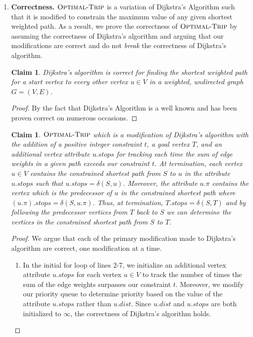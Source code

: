 \documentclass[11pt]{article}
\newtheorem{claim}[theorem]{Claim}
\theoremstyle{nonumberplain}
\newtheorem{proof}{Proof}
\begin{document}
\begin{enumerate}
\begin{codebox}
\end{codebox}
\item \textbf{Correctness.} %
$\textnormal{\scshape Optimal-Trip}$ is a variation of Dijkstra's Algorithm such that it is modified to constrain the maximum value of any given shortest weighted path. %
As a result, we prove the correctness of $\textnormal{\scshape Optimal-Trip}$ by assuming the correctness of Dijkstra's algorithm and arguing that our modifications are correct and do not \emph{break} the correctness of Dijkstra's algorithm.
\begin{claim}
Dijkstra's algorithm is correct for finding the shortest weighted path for a start vertex to every other vertex $u \in V$ in a weighted, undirected graph $G=(V,E)$.
\end{claim}
\begin{proof}
By the fact that Dijkstra's Algorithm is a well known and has been proven correct on numerous occasions.
\end{proof}
\begin{claim}
$\textnormal{\scshape Optimal-Trip}$ which is a modification of Dijkstra's algorithm with the addition of a positive integer constraint $t$, a goal vertex $T$, and an additional vertex attribute $u.stops$ for tracking each time the sum of edge weights in a given path exceeds our constraint $t$. At termination, each vertex $u \in V$ contains the constrained shortest path from $S$ to $u$ in the attribute $u.stops$ such that $u.stops=\delta(S,u)$. Moreover, the attribute $u.\pi$ contains the vertex which is the predecessor of $u$ in the constrained shortest path where $(u.\pi).stops=\delta(S,u.\pi)$. Thus, at termination, $T.stops=\delta(S,T)$ and by following the predecessor vertices from $T$ back to $S$ we can determine the vertices in the constrained shortest path from $S$ to $T$.
\end{claim}
\begin{proof}
We argue that each of the primary modification made to Dijkstra's algorithm are correct, one modification at a time.
\begin{enumerate}
    \item In the initial for loop of lines 2-7, we initialize an additional vertex attribute $u.stops$ for each vertex $u \in V$ to track the number of times the sum of the edge weights surpasses our constraint $t$. Moreover, we modify our priority queue to determine priority based on the value of the attribute $u.stops$ rather than $u.dist$. Since $u.dist$ and $u.stops$ are both initialized to $\infty$, the correctness of Dijkstra's algorithm holds.

\end{enumerate}
\end{proof}
\end{enumerate}
\end{document}
